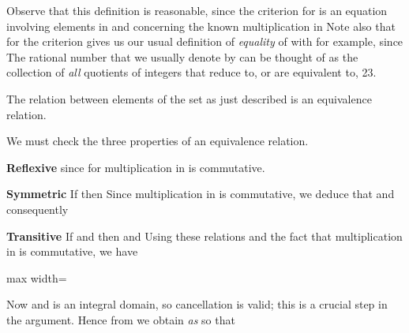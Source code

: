 \documentclass[11pt,oneside]{article}
\begin{document}
\begin{BookBody}
Observe that this definition is reasonable, since the criterion for  is an equation  involving elements in  and concerning the known multiplication in  Note also that for  the criterion gives us our usual definition of\textit{ equality} of  with  for example,  since  The rational number that we usually denote by  can be thought of as the collection of\textit{ all} quotients of integers that reduce to, or are equivalent to, 23.

 The relation \BookInline{\sim } between elements of the set  as just described is an equivalence relation.

 We must check the three properties of an equivalence relation.

\textbf{Reflexive}  since  for multiplication in  is commutative.

\textbf{Symmetric} If  then  Since multiplication in  is commutative, we deduce that  and consequently 

\textbf{Transitive} If  and  then  and  Using these relations and the fact that multiplication in  is commutative, we have

\begin{center}\begin{adjustbox}{max width=\linewidth}\end{adjustbox}\end{center}

Now  and  is an integral domain, so cancellation is valid; this is a crucial step in the argument. Hence from  we obtain\textit{ as}  so that \BookEnd{\blacklozenge}


\end{BookBody}
\end{document}
